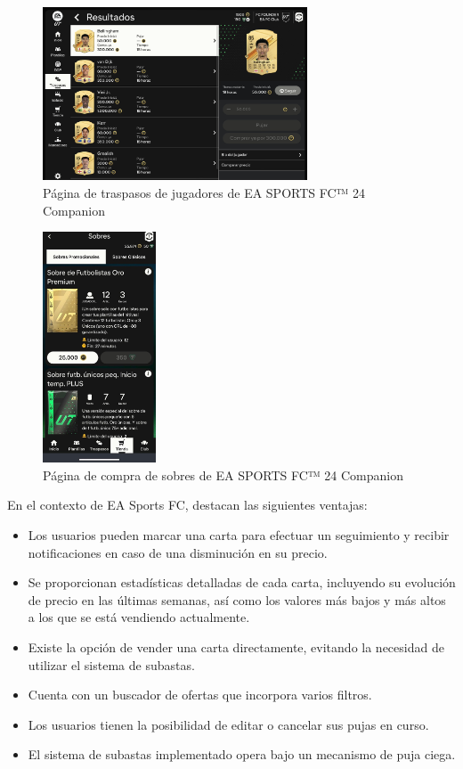 \begin{figure}[H]
    \centering
    \includegraphics[width=0.7\textwidth]{figures/4-Estudio-viabilidad/4_FC_Companion.png}
    \caption{Página de traspasos de jugadores de EA SPORTS FC™ 24 Companion}
    \label{fig:ea_sports_fc_1}
    \hypertarget{fig:ea_sports_fc_1}{}
\end{figure}

\begin{figure}[H]
    \centering
    \includegraphics[width=0.3\textwidth]{figures/4-Estudio-viabilidad/4_FC_Companion2.jpeg}
    \caption{Página de compra de sobres de EA SPORTS FC™ 24 Companion}
    \label{fig:ea_sports_fc_2}
    \hypertarget{fig:ea_sports_fc_2}{}
\end{figure}

En el contexto de EA Sports FC, destacan las siguientes ventajas:
\begin{itemize}
    \item Los usuarios pueden marcar una carta para efectuar un seguimiento y recibir notificaciones en caso de una disminución en su precio.
    \item Se proporcionan estadísticas detalladas de cada carta, incluyendo su evolución de precio en las últimas semanas, así como los valores más bajos y más altos a los que se está vendiendo actualmente.
    \item Existe la opción de vender una carta directamente, evitando la necesidad de utilizar el sistema de subastas. 
    \item Cuenta con un buscador de ofertas que incorpora varios filtros.
    \item Los usuarios tienen la posibilidad de editar o cancelar sus pujas en curso.
    \item El sistema de subastas implementado opera bajo un mecanismo de puja ciega.
\end{itemize}


